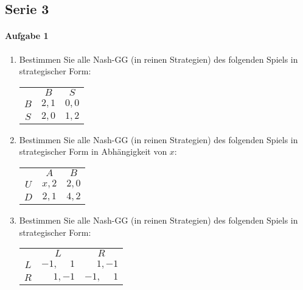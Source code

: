 \subsection{Serie 3}%
\label{sub:serie_3}

\paragraph{Aufgabe 1}%
\label{par:serie_3_aufgabe_1}

\begin{enumerate}
  \item Bestimmen Sie alle Nash-GG (in reinen Strategien) des folgenden Spiels in
    strategischer Form:
    \begin{center}
      \begin{tabular}{ccc}
        & $B$ & $S$\\
        \cmidrule{2-3}
        $B$ & $2,1$ & $0,0$\\
        \cmidrule{2-3}
        $S$ & $2,0$ & $1,2$\\
        \cmidrule{2-3}
      \end{tabular}
    \end{center}
  \item Bestimmen Sie alle Nash-GG (in reinen Strategien) des folgenden Spiels in
    strategischer Form in Abhängigkeit von $x$:
    \begin{center}
      \begin{tabular}{ccc}
        & $A$ & $B$\\
        \cmidrule{2-3}
        $U$ & $x,2$ & $2,0$\\
        \cmidrule{2-3}
        $D$ & $2,1$ & $4,2$\\
        \cmidrule{2-3}
      \end{tabular}
    \end{center}
  \item Bestimmen Sie alle Nash-GG (in reinen Strategien) des folgenden Spiels in
    strategischer Form:
    \begin{center}
      \begin{tabular}{ccc}
        & $L$ & $R$\\
        \cmidrule{2-3}
        $L$ & $-1, \phantom{-}1$ & $\phantom{-}1, -1$\\
        \cmidrule{2-3}
        $R$ & $\phantom{-}1, -1$ & $-1, \phantom{-}1$\\
        \cmidrule{2-3}
      \end{tabular}
    \end{center}
\end{enumerate}

